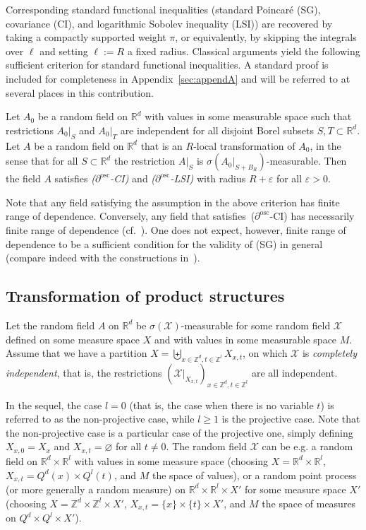 \documentclass[10pt]{amsart}
\theoremstyle{definition}\newtheorem{defi}[theo]{Definition}\newtheorem{rema}[theo]{Remark}\newtheorem{exam}[theo]{Example}\newtheorem{exem}[theo]{Example}\newtheorem{nota}[theo]{Notation}
\newcommand{\R}{\mathbb R}
\newcommand{\Z}{\mathbb Z}
\newcommand{\X}{\mathcal X}
\newcommand{\e}{\varepsilon}
\newcommand{\osc}{\partial^{\mathrm{osc}}}
\newcommand*{\MK}{\mkern 2mu}
\begin{document}
Corresponding standard functional inequalities (standard Poincaré (SG), covariance (CI), and logarith\-mic Sobo\-lev inequality (LSI)) are recovered by taking a compactly supported weight $\pi$, or equivalently, by skipping the integrals over $\ell$ and setting $\ell:=R$ a fixed radius. Classical arguments yield the following sufficient criterion for standard functional inequalities. A standard proof is included for completeness in Appendix~\ref{sec:appendA} and will be referred to at several places in this contribution.

\begin{prop}\label{prop:criMSG}
Let $A_0$ be a random field on $\R^d$ with values in some measurable space such that restrictions $A_0|_{S}$ and $A_0|_T$ are independent for all disjoint Borel subsets $S,T\subset\R^d$. Let $A$ be a random field on $\R^d$ that is an $R$-local transformation of $A_0$, in the sense that for all $S\subset\R^d$ the restriction $A|_{S}$ is $\sigma(A_0|_{S+B_{R}})$-measurable. Then the field $A$ satisfies \emph{($\osc$-CI)} and \emph{($\osc$-LSI)} with radius $R+\e$ for all $\e>0$.
\end{prop}

Note that any field satisfying the assumption in the above criterion has finite range of dependence. Conversely, any field that satisfies~($\osc$-CI) has necessarily finite range of dependence (cf.~\cite[Proposition~1.4$\MK$(iv)]{DG1}). One does not expect, however, finite range of dependence to be a sufficient condition for the validity of (SG) in general (compare indeed with the constructions in~\cite{Burton-Goulet-Meester-93,Bradley-94}).


\subsection{Transformation of product structures}\label{eq:transfiid}

Let the random field $A$ on $\R^d$ be $\sigma(\X)$-measurable for some random field $\X$ defined on some measure space $X$ and with values in some measurable space $M$. Assume that we have a partition $X=\biguplus_{x\in\Z^d,t\in\Z^l}X_{x,t}$, on which $\X$ is \emph{completely independent}, that is, the restrictions $(\X|_{X_{x,t}})_{x\in\Z^d,t\in\Z^l}$ are all independent.


In the sequel, the case $l=0$ (that is, the case when there is no variable $t$) is referred to as the non-projective case, while $l\ge1$ is the projective case. Note that the non-projective case is a particular case of the projective one, simply defining $X_{x,0}=X_x$ and $X_{x,t}=\varnothing$ for all $t\ne0$. The random field $\X$ can be e.g. a random field on $\R^d\times\R^l$ with values in some measure space (choosing $X=\R^d\times\R^l$, $X_{x,t}=Q^d(x)\times Q^l(t)$, and $M$ the space of values), or a random point process (or more generally a random measure) on $\R^d\times\R^l\times X'$ for some measure space $X'$ (choosing $X=\Z^d\times\Z^l\times X'$, $X_{x,t}=\{x\}\times\{t\}\times X'$, and $M$ the space of measures on $Q^d\times Q^l\times X'$).
\end{document}
